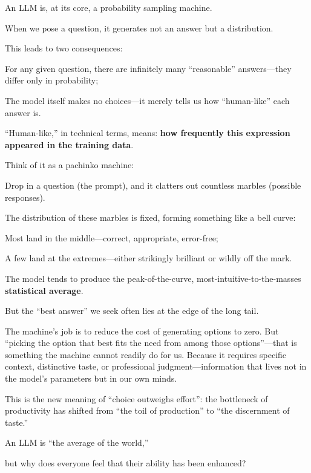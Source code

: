 An LLM is, at its core, a probability sampling machine.

When we pose a question, it generates not an answer but a distribution.

This leads to two consequences:

For any given question, there are infinitely many ``reasonable'' answers---they differ only in probability;

The model itself makes no choices---it merely tells us how ``human-like'' each answer is.

\vspace{1em}

``Human-like,'' in technical terms, means: \textbf{how frequently this expression appeared in the training data}.

\vspace{1em}

Think of it as a pachinko machine:

Drop in a question (the prompt), and it clatters out countless marbles (possible responses).

The distribution of these marbles is fixed, forming something like a bell curve:

Most land in the middle---correct, appropriate, error-free;

A few land at the extremes---either strikingly brilliant or wildly off the mark.

\vspace{1em}

The model tends to produce the peak-of-the-curve, most-intuitive-to-the-masses \textbf{statistical average}.

But the ``best answer'' we seek often lies at the edge of the long tail.

The machine's job is to reduce the cost of generating options to zero. But ``picking the option that best fits the need from among those options''---that is something the machine cannot readily do for us.
Because it requires specific context, distinctive taste, or professional judgment---information that lives not in the model's parameters but in our own minds.

\vspace{1em}

This is the new meaning of ``choice outweighs effort'': the bottleneck of productivity has shifted from ``the toil of production'' to ``the discernment of taste.''

\begin{thinkbox}[Reflection]
    An LLM is ``the average of the world,''

    but why does everyone feel that their ability has been enhanced?
\end{thinkbox}

